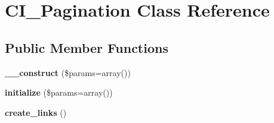 \section{C\-I\-\_\-\-Pagination Class Reference}
\label{class_c_i___pagination}
\subsection*{Public Member Functions}
\begin{DoxyCompactItemize}
\item 
{\bf \-\_\-\-\_\-construct} (\$params=array())
\item 
{\bf initialize} (\$params=array())
\item 
{\bf create\-\_\-links} ()
\end{DoxyCompactItemize}
